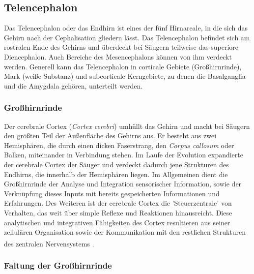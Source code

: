 \documentclass[12pt,a4paper,pdftex]{article}
\begin{document}
\subsection{Telencephalon}
\label{subsec:Telencephalon} 

Das Telencephalon oder das Endhirn ist eines der fünf Hirnareale, in die sich das Gehirn nach der Cephalisation gliedern lässt. Das Telencephalon befindet sich am rostralen Ende des Gehirns und überdeckt bei Säugern teilweise das superiore Diencephalon. Auch Bereiche des Mesencephalons können von ihm verdeckt werden. Generell kann das Telencephalon in corticale Gebiete (Großhirnrinde), Mark (weiße Substanz) und subcorticale Kerngebiete, zu denen die Basalganglia und die Amygdala gehören, unterteilt werden. 

\subsubsection{Großhirnrinde}
\label{subsubsec:Grosshirnrinde}

Der cerebrale Cortex (\textit{Cortex cerebri})  umhüllt das Gehirn und macht bei Säugern den größten Teil der Außenfläche des Gehirns aus. Er besteht aus zwei Hemisphären, die durch einen dicken Faserstrang, den \textit{Corpus callosum}  oder Balken, miteinander in Verbindung stehen. Im Laufe der Evolution expandierte der cerebrale Cortex der Säuger und verdeckt dadurch jene Strukturen des Endhirns, die innerhalb der Hemisphären liegen. Im Allgemeinen dient die Großhirnrinde der Analyse und Integration sensorischer Information, sowie der Verknüpfung  dieses Inputs mit bereits gespeicherten Informationen und Erfahrungen. Des Weiteren ist der cerebrale Cortex die 'Steuerzentrale' von Verhalten, das weit über simple Reflexe und Reaktionen hinausreicht. Diese analytischen und integrativen Fähigkeiten des Cortex resultieren aus seiner zellulären Organisation sowie der Kommunikation mit den restlichen Strukturen des zentralen Nervensystems \textsuperscript{\cite[7]{watson2010thebrain}}.


\subsubsection*{Faltung der Großhirnrinde}
\end{document}
